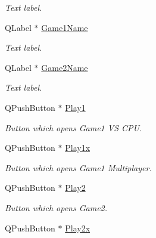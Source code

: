 \begin{DoxyCompactItemize}
\begin{DoxyCompactList}\small\item\em Text label. \end{DoxyCompactList}\item 
\hypertarget{classmenuWidget_a7a6cfb47276b2e2f92bbe43f43614858}{Q\-Label $\ast$ \hyperlink{classmenuWidget_a7a6cfb47276b2e2f92bbe43f43614858}{Game1\-Name}}\label{classmenuWidget_a7a6cfb47276b2e2f92bbe43f43614858}

\begin{DoxyCompactList}\small\item\em Text label. \end{DoxyCompactList}\item 
\hypertarget{classmenuWidget_a2d56013e2d8b9ea4e717c99736010ae1}{Q\-Label $\ast$ \hyperlink{classmenuWidget_a2d56013e2d8b9ea4e717c99736010ae1}{Game2\-Name}}\label{classmenuWidget_a2d56013e2d8b9ea4e717c99736010ae1}

\begin{DoxyCompactList}\small\item\em Text label. \end{DoxyCompactList}\item 
\hypertarget{classmenuWidget_a70ff1c0dcec6af40c1b6561574820ec5}{Q\-Push\-Button $\ast$ \hyperlink{classmenuWidget_a70ff1c0dcec6af40c1b6561574820ec5}{Play1}}\label{classmenuWidget_a70ff1c0dcec6af40c1b6561574820ec5}

\begin{DoxyCompactList}\small\item\em Button which opens Game1 V\-S C\-P\-U. \end{DoxyCompactList}\item 
\hypertarget{classmenuWidget_aea0da0d27778d1e6dace5f0ba1c8f861}{Q\-Push\-Button $\ast$ \hyperlink{classmenuWidget_aea0da0d27778d1e6dace5f0ba1c8f861}{Play1x}}\label{classmenuWidget_aea0da0d27778d1e6dace5f0ba1c8f861}

\begin{DoxyCompactList}\small\item\em Button which opens Game1 Multiplayer. \end{DoxyCompactList}\item 
\hypertarget{classmenuWidget_a1c62767432beaec45f3bac011a6753df}{Q\-Push\-Button $\ast$ \hyperlink{classmenuWidget_a1c62767432beaec45f3bac011a6753df}{Play2}}\label{classmenuWidget_a1c62767432beaec45f3bac011a6753df}

\begin{DoxyCompactList}\small\item\em Button which opens Game2. \end{DoxyCompactList}\item 
\hypertarget{classmenuWidget_a1d03dc63bea2717df6551ba5f58191f1}{Q\-Push\-Button $\ast$ \hyperlink{classmenuWidget_a1d03dc63bea2717df6551ba5f58191f1}{Play2x}}\label{classmenuWidget_a1d03dc63bea2717df6551ba5f58191f1}


\end{DoxyCompactItemize}
